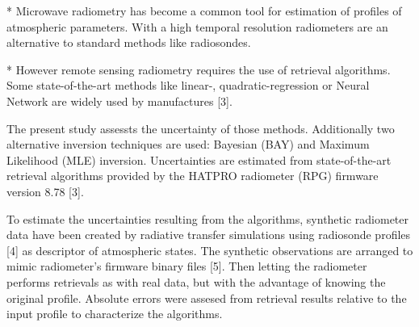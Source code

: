 \documentclass[landscape,paperwidth=1189mm,paperheight=841mm,fontscale=0.4,margin=.7cm]{baposter}
\begin{document}
\begin{poster}
{* Microwave radiometry has become a common tool for estimation of profiles of atmospheric parameters. With a high temporal resolution radiometers are an alternative to standard methods like radiosondes.

* However remote sensing radiometry requires the use of retrieval algorithms. Some state-of-the-art methods like linear-, quadratic-regression or Neural Network are widely used by manufactures [3].

The present study assessts the uncertainty of those methods. Additionally two alternative inversion techniques are used: Bayesian (BAY) and Maximum Likelihood (MLE) inversion. Uncertainties are estimated from state-of-the-art retrieval algorithms provided by the HATPRO radiometer (RPG) firmware version 8.78 [3].

To estimate the uncertainties resulting from the algorithms, synthetic radiometer data have been created by radiative transfer simulations using radiosonde profiles [4] as descriptor of atmospheric states. The synthetic observations are arranged to mimic radiometer's firmware binary files [5]. Then letting the radiometer performs retrievals as with real data, but with the advantage of knowing the original profile. Absolute errors were assesed from retrieval results relative to the input profile to characterize the algorithms.

}
\end{poster}
\end{document}
